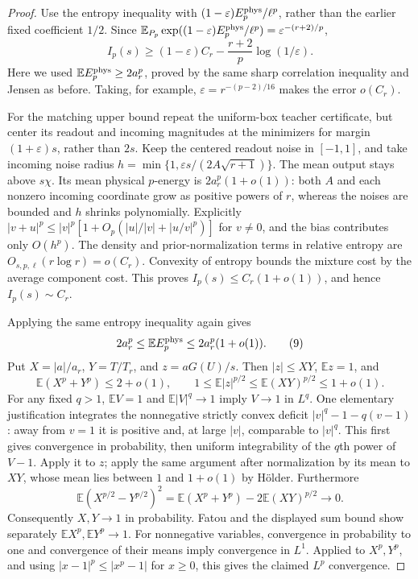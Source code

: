 \documentclass[11pt]{article}
\newcommand{\E}{\mathbb E}\newcommand{\Pp}{\mathbb P}
\begin{document}
\begin{proof}
Use the entropy inequality with
$(1-\varepsilon)E_p^{\rm phys}/\ell^p$, rather than the earlier fixed
coefficient $1/2$. Since
$\E_{P_p}\exp((1-\varepsilon)E_p^{\rm phys}/\ell^p)
=\varepsilon^{-(r+2)/p}$,
\[
 I_p(s)\ge (1-\varepsilon)C_r
                  -\frac{r+2}{p}\log(1/\varepsilon).       \tag{8}
\]
Here we used $\E E_p^{\rm phys}\ge2a_r^p$, proved by the same
sharp correlation inequality and Jensen as before. Taking, for example,
$\varepsilon=r^{-(p-2)/16}$ makes the error $o(C_r)$.

For the matching upper bound repeat the uniform-box teacher certificate,
but center its readout and incoming magnitudes at the minimizers for
margin $(1+\varepsilon)s$, rather than $2s$. Keep the centered readout
noise in $[-1,1]$, and take incoming noise radius
$h=\min\{1,\varepsilon s/(2A\sqrt{r+1})\}$.
The mean output stays above $s\chi$. Its mean physical $p$-energy is
$2a_r^p(1+o(1))$: both $A$ and each nonzero incoming coordinate grow
as positive powers of $r$, whereas the noises are bounded and $h$
shrinks polynomially. Explicitly
$|v+u|^p\le |v|^p[1+O_p(|u|/|v|+|u/v|^p)]$ for $v\ne0$,
and the bias contributes only $O(h^p)$.
The density and prior-normalization terms in relative entropy are
$O_{s,p,\ell}(r\log r)=o(C_r)$. Convexity of entropy bounds the
mixture cost by the average component cost. This proves
$I_p(s)\le C_r(1+o(1))$, and hence $I_p(s)\sim C_r$.

Applying the same entropy inequality again gives
\[
 2a_r^p\le\E E_p^{\rm phys}\le2a_r^p(1+o(1)).             \tag{9}
\]
Put $X=|a|/a_r$, $Y=T/T_r$, and $z=aG(U)/s$. Then
$|z|\le XY$, $\E z=1$, and
\[
 \E(X^p+Y^p)\le2+o(1),\qquad
 1\le\E|z|^{p/2}\le\E(XY)^{p/2}\le1+o(1).
\]
For any fixed $q>1$, $\E V=1$ and $\E|V|^q\to1$ imply
$V\to1$ in $L^q$. One elementary justification integrates the
nonnegative strictly convex deficit
$|v|^q-1-q(v-1)$: away from $v=1$ it is positive and, at large $|v|$,
comparable to $|v|^q$. This first gives convergence in probability,
then uniform integrability of the $q$th power of $V-1$.
Apply it to $z$; apply the same argument after normalization by its
mean to $XY$, whose mean lies between $1$ and $1+o(1)$ by H\"older.
Furthermore
\[
 \E(X^{p/2}-Y^{p/2})^2
  =\E(X^p+Y^p)-2\E(XY)^{p/2}\to0.
\]
Consequently $X,Y\to1$ in probability. Fatou and the displayed sum
bound show separately $\E X^p,\E Y^p\to1$. For nonnegative
variables, convergence in probability to one and convergence of their
means imply convergence in $L^1$. Applied to $X^p,Y^p$, and using
$|x-1|^p\le|x^p-1|$ for $x\ge0$, this gives the claimed $L^p$
convergence.


\end{proof}
\end{document}
